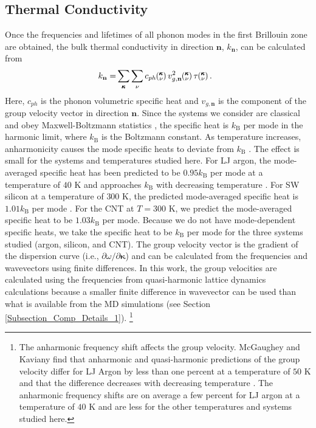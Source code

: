 \subsection{\label{Subsection_Comp_Details_3}Thermal Conductivity}
Once the frequencies and lifetimes of all phonon modes in the first
Brillouin zone are obtained, the bulk thermal conductivity in direction
$\mathbf{n}$, $k_{\mathbf{n}}$, can be calculated from 
\cite{ziman_electrons_2001}
\begin{equation}\label{E-size:k_bulk}\
\begin{split}
k_{\mathbf{n}}=&\sum_{\pmb{\kappa}} \sum_\nu c_{ph} \kv 
v^{2}_{g,\mathbf{n}} \kv \tau \kv.
\end{split}
\end{equation}
Here, $c_{ph}$ is the phonon volumetric specific heat and 
${v}_{g,\mathbf{n}}$ is
the component of the group velocity vector in direction $\mathbf{n}$. 
Since the systems 
we consider are classical and obey Maxwell-Boltzmann statistics 
\cite{mcquarrie_statistical_2000}, the
specific heat is $k_{\mathrm{B}}$ per mode in the harmonic limit, where 
$k_{\mathrm{B}}$ 
is the Boltzmann constant. As temperature increases, anharmonicity causes 
the mode specific 
heats to deviate from $k_{\mathrm{B}}$ \cite{mcgaughey_quantitative_2004}. 
The effect is small for the 
systems and temperatures studied here. For LJ argon, the mode-averaged 
specific heat has 
been predicted to be $0.95k_{\mathrm{B}}$ per mode at a temperature of 
$40$ K and approaches 
$k_{\mathrm{B}}$ with decreasing temperature 
\cite{mcgaughey_quantitative_2004}. For SW silicon at a 
temperature of $300$ K, the predicted mode-averaged specific heat is 
$1.01k_{\mathrm{B}}$ 
per mode \cite{goicochea_thermal_2010}. For the CNT at $T=300$ K, we 
predict the mode-averaged 
specific heat to be $1.03k_{\mathrm{B}}$ per mode. Because we do not have 
mode-dependent 
specific heats, we take the specific heat to be $k_{\mathrm{B}}$ per mode 
for the three 
systems studied (argon, silicon, and CNT).  The group velocity vector is 
the gradient of 
the dispersion curve (i.e., $\partial \omega / \partial \pmb{\kappa}$) and 
can be calculated 
from the frequencies and wavevectors using finite differences. In this 
work, the group 
velocities are calculated using the frequencies from quasi-harmonic 
lattice dynamics 
calculations because a smaller finite difference in wavevector can be used 
than what is 
available from the MD simulations (see Section 
\ref{Subsection_Comp_Details_1}).
\footnote[2]{The anharmonic frequency shift affects the group velocity. 
McGaughey and Kaviany find that anharmonic and quasi-harmonic predictions 
of 
the group velocity differ for LJ Argon by less than one percent at a 
temperature of 
$50$ K and that the difference decreases with decreasing temperature 
\cite{mcgaughey_quantitative_2004}. 
The anharmonic frequency shifts are on average a few percent for LJ argon 
at a temperature 
of $40$ K and are less for the other temperatures and systems studied here.}
